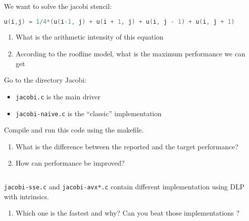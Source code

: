 \documentclass[11pt,a4paper]{article}
\begin{document}
\begin{exercise}
  $~$ %

We want to solve the jacobi stencil:

\begin{lstlisting}[language=C]
u(i,j) = 1/4*(u(i-1, j) + u(i + 1, j) + u(i, j - 1) + u(i, j + 1)
\end{lstlisting}

\begin{enumerate}
\item What is the arithmetic intensity of this equation
\item According to the roofline model, what is the maximum performance we can get
\end{enumerate}

Go to the directory Jacobi:

\begin{itemize}
\item \texttt{jacobi.c} is the main driver
\item \texttt{jacobi-naive.c} is the ``classic'' implementation
\end{itemize}

Compile and run this code using the makefile. 

\begin{enumerate}
\item What is the difference between the reported and the target performance?
\item How can performance be improved?
\end{enumerate}

\end{exercise}


\begin{exercise}
  $~$ %


\texttt{jacobi-sse.c} and \texttt{jacobi-avx*.c} contain different implementation using DLP with intrinsics. 

\begin{enumerate}
\item Which one is the fastest and why? Can you beat those implementations ?
\end{enumerate}

\end{exercise}
\end{document}
